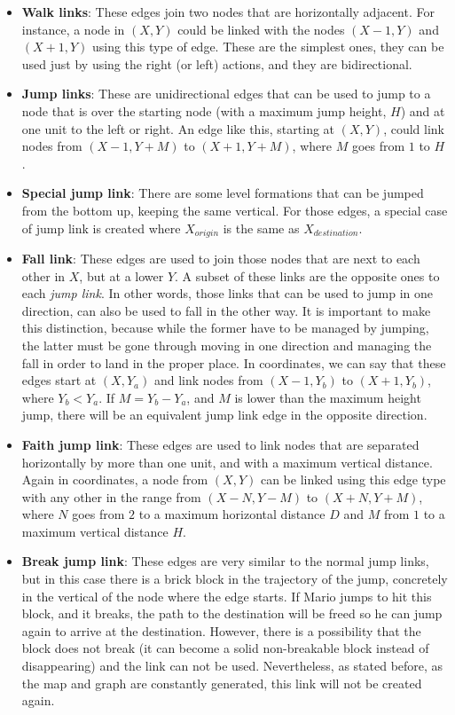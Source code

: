 \documentclass[conference]{IEEEtran}
\begin{document}
\begin{itemize}
\item \textbf{Walk links}: These edges join two nodes that are horizontally adjacent. For
instance, a node in $(X,Y)$ could be linked with the nodes $(X-1,Y)$ and $(X+1,Y)$ using
this type of edge. These are the simplest ones, they can be used just by using 
the right (or left) actions, and they are bidirectional.
\item \textbf{Jump links}: These are unidirectional edges that can be used to 
jump to a node that is over the starting node (with a maximum jump height, $H$) 
and at one unit to the left or right. An edge like this, starting at $(X,Y)$, 
could link nodes from $(X-1,Y+M)$ to $(X+1,Y+M)$, where $M$ goes from $1$ 
to $H$.
\item \textbf{Special jump link}: There are some level formations that can be jumped from
the bottom up, keeping the same vertical. For those edges, a special case of
jump link is created where $X_{origin}$ is the same as $X_{destination}$.
\item \textbf{Fall link}: These edges are used to join those nodes that are next
to each other in $X$, but at a lower $Y$. A subset of these links are the opposite ones
to each \textit{jump link}. In other words, those links that
can be used to jump in one direction, can also be used to fall in the
other way. It is important to make this distinction, because while the former have
to be managed by jumping, the latter must be gone through moving in one direction
and managing the fall in order to land in the proper place. 
In coordinates, we can say that these edges start at $(X,Y_{a})$
and link nodes from $(X-1,Y_{b})$ to $(X+1,Y_{b})$, where $Y_{b}<Y_{a}$. 
If $M = Y_{b}-Y_{a}$, and $M$ is lower than the maximum height jump, there will be
an equivalent jump link edge in the opposite direction.

\item \textbf{Faith jump link}: These edges are used to link nodes that are separated
horizontally by more than one unit, and with a maximum vertical distance. Again in
coordinates, a node from $(X,Y)$ can be linked using this edge type with any other
in the range from $(X-N,Y-M)$ to $(X+N,Y+M)$, where $N$ goes from $2$ to a maximum 
horizontal distance $D$ and $M$ from $1$ to a maximum vertical distance $H$.
\item \textbf{Break jump link}: These edges are very similar to the normal jump
links, but in this case there is a brick block in the trajectory of the jump, concretely
in the vertical of the node where the edge starts. If Mario jumps to hit this block, and it 
breaks, the path to the destination will be freed so he can jump again to arrive at the 
destination. However, there is a possibility that the block does not break (it can become 
a solid non-breakable block instead of disappearing) and the link can not be used. 
Nevertheless, as stated before, as the map and graph are constantly generated, this 
link will not be created again.
\end{itemize}
\end{document}
